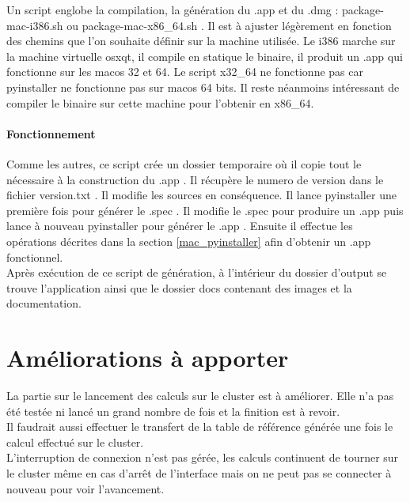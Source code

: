 \documentclass[12pt,a4paper]{article}
\begin{document}
        Un script englobe la compilation, la génération du .app et du .dmg : package-mac-i386.sh ou
        package-mac-x86\_64.sh . Il est à ajuster légèrement en fonction des chemins que l'on souhaite définir
        sur la machine utilisée. Le i386 marche sur la machine virtuelle osxqt, il compile en statique
        le binaire, il produit un .app qui fonctionne sur les macos 32 et 64. Le script x32\_64 ne fonctionne pas
        car pyinstaller ne fonctionne pas sur macos 64 bits. Il reste néanmoins intéressant de compiler le binaire
        sur cette machine pour l'obtenir en x86\_64.

        \paragraph{Fonctionnement}

        Comme les autres, ce script crée un dossier temporaire où il copie tout
        le nécessaire à la construction du .app .  Il récupère le numero de
        version dans le fichier version.txt . Il modifie les sources en
        conséquence. Il lance pyinstaller une première fois pour générer le
        .spec . Il modifie le .spec pour produire un .app puis lance à nouveau
        pyinstaller pour générer le .app .  Ensuite il effectue les opérations
        décrites dans la section \ref{mac_pyinstaller} afin d'obtenir un .app
        fonctionnel.\\

        Après exécution de ce script de génération, à l'intérieur du dossier
        d'output se trouve l'application ainsi que le dossier docs contenant des
        images et la documentation.

\section{Améliorations à apporter}
    La partie sur le lancement des calculs sur le cluster est à améliorer. Elle
    n'a pas été testée ni lancé un grand nombre de fois et la finition est à
    revoir.\\
    
    Il faudrait aussi effectuer le transfert de la table de référence
    générée une fois le calcul effectué sur le cluster.\\
    
    L'interruption de
    connexion n'est pas gérée, les calculs continuent de tourner sur le cluster
    même en cas d'arrêt de l'interface mais on ne peut pas se connecter à
    nouveau pour voir l'avancement.
\end{document}
